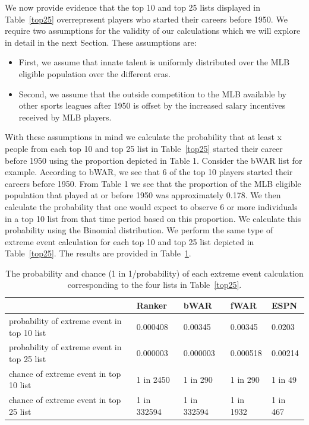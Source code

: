 \documentclass[11pt]{article}\usepackage[]{graphicx}\usepackage[]{color}
\begin{document}
We now provide evidence that the top 10 and top 25 lists displayed in 
Table~\ref{top25} overrepresent players who started their careers 
before 1950.  
We require two assumptions for the validity of our calculations which we will 
explore in detail in the next Section. 
These assumptions are: 
\begin{itemize}
\item First, we assume that innate talent is uniformly distributed over the 
  MLB eligible population over the different eras.
\item Second, we assume that the outside competition to the MLB available by 
  other sports leagues after 1950 is offset by the increased salary 
  incentives received by MLB players.
\end{itemize}








With these assumptions in mind we calculate the probability that at least x 
people from each top 10 and top 25 list in Table~\ref{top25} started their 
career before 1950 using the proportion depicted in Table 1.  Consider the 
bWAR list for example.  According to bWAR, we see that 6 of the top 10 
players started their careers before 1950.  From Table 1 we see that the 
proportion of the MLB eligible population that played at or  
before 1950 was approximately 0.178.  
We then calculate the probability that one would expect to observe 6 or more 
individuals in a top 10 list from that time period based on this proportion.  
We calculate this probability using the Binomial distribution.  
We perform the same type of extreme event 
calculation for each top 10 and top 25 list depicted in Table~\ref{top25}.  
The results are provided in Table~\ref{probvalues}.


\begin{table}[h!]
\begin{center}
\begin{tabular}{lllll}
\hline
  &  Ranker  &  bWAR  &  fWAR  &  ESPN \\
  \hline
probability of extreme event in top 10 list 
  & 0.000408 
  & 0.00345 
  & 0.00345 
  & 0.0203 \\
probability of extreme event in top 25 list 
  & 0.000003 
  & 0.000003 
  & 0.000518 
  & 0.00214 \\
chance of extreme event in top 10 list 
  & 1 in 2450 
  & 1 in 290 
  & 1 in 290 
  & 1 in 49 \\
chance of extreme event in top 25 list 
  & 1 in 332594 
  & 1 in 332594 
  & 1 in 1932 
  & 1 in 467 \\
  \hline
\end{tabular}
\end{center}
\caption{The probability and chance (1 in 1/probability) of each extreme event 
  calculation corresponding to the four lists in Table~\ref{top25}.}
\label{probvalues}
\end{table}
\end{document}
